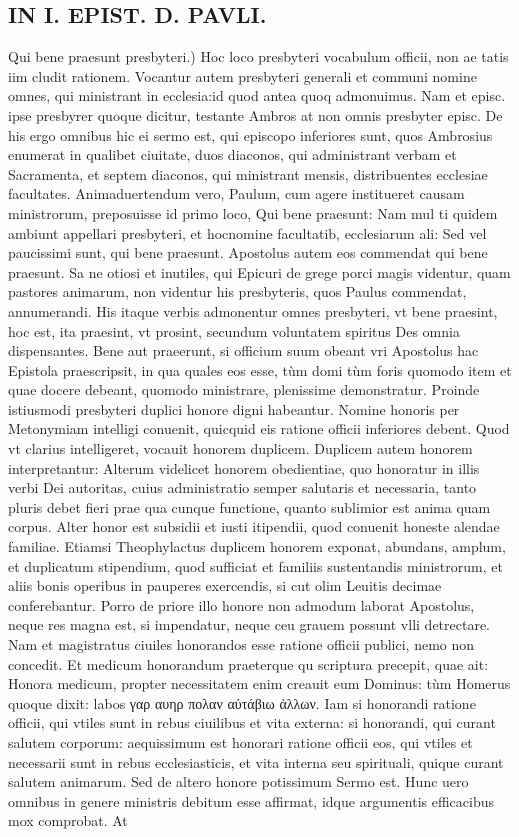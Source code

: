\documentclass{article}
\begin{document}
\begin{pages}
\section*{IN I. EPIST. D. PAVLI. }
\marginpar{[ p.113 ]}\pstart Qui bene praesunt presbyteri.) Hoc loco presbyteri vocabulum officii, non ae tatis iim cludit rationem. Vocantur autem presbyteri generali et communi nomine omnes, qui ministrant in ecclesia:id quod antea quoq admonuimus. Nam et episc. ipse presbyrer quoque dicitur, testante Ambros at non omnis presbyter episc. De his ergo omnibus hic ei sermo est, qui episcopo inferiores sunt, quos Ambrosius enumerat in qualibet ciuitate, duos diaconos, qui administrant verbam et Sacramenta, et septem diaconos, qui ministrant mensis, distribuentes ecclesiae facultates. Animaduertendum vero, Paulum, cum agere institueret causam ministrorum, preposuisse id primo loco, Qui bene praesunt: Nam mul ti quidem ambiunt appellari presbyteri, et hocnomine facultatib, ecclesiarum ali: Sed vel paucissimi sunt, qui bene praesunt. Apostolus autem eos commendat qui bene praesunt. Sa ne otiosi et inutiles, qui Epicuri de grege porci magis videntur, quam pastores animarum, non videntur his presbyteris, quos Paulus commendat, annumerandi. His itaque verbis admonentur omnes presbyteri, vt bene praesint, hoc est, ita praesint, vt prosint, secundum voluntatem spiritus Des omnia dispensantes. Bene aut praeerunt, si officium suum obeant vri Apostolus hac Epistola praescripsit, in qua quales eos esse, tùm domi tùm foris quomodo item et quae docere debeant, quomodo ministrare, plenissime demonstratur. Proinde istiusmodi presbyteri duplici honore digni habeantur. Nomine honoris per Metonymiam intelligi conuenit, quicquid eis ratione officii inferiores debent. Quod vt clarius intelligeret, vocauit honorem duplicem. Duplicem autem honorem interpretantur: Alterum videlicet honorem obedientiae, quo honoratur in illis verbi Dei autoritas, cuius administratio semper salutaris et necessaria, tanto pluris debet fieri prae qua cunque functione, quanto sublimior est anima quam corpus. Alter honor est subsidii et iusti itipendii, quod conuenit honeste alendae familiae. Etiamsi Theophylactus duplicem honorem exponat, abundans, amplum, et duplicatum stipendium, quod sufficiat et familiis sustentandis ministrorum, et aliis bonis operibus in pauperes exercendis, si cut olim Leuitis decimae conferebantur. Porro de priore illo honore non admodum laborat Apostolus, neque res magna est, si impendatur, neque ceu grauem possunt vlli detrectare. Nam et magistratus ciuiles honorandos esse ratione officii publici, nemo non concedit. Et medicum honorandum praeterque qu scriptura precepit, quae ait: Honora medicum, propter necessitatem enim creauit eum Dominus: tùm Homerus quoque dixit: labos γαρ αυηρ πολαν αὐτάβιω ἀλλων. Iam si honorandi ratione officii, qui vtiles sunt in rebus ciuilibus et vita externa: si honorandi, qui curant salutem corporum: aequissimum est honorari ratione officii eos, qui vtiles et necessarii sunt in rebus ecclesiasticis, et vita interna seu spirituali, quique curant salutem animarum. Sed de altero honore potissimum Sermo est. Hunc uero omnibus in genere ministris debitum esse affirmat, idque argumentis efficacibus mox comprobat. At 
\end{pages}
\end{document}
